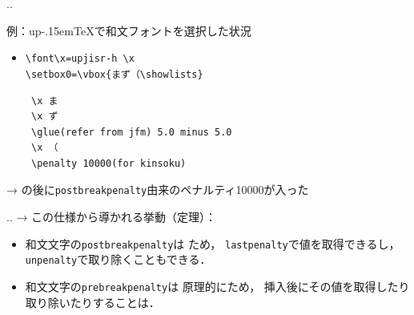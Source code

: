 \documentclass[a5paper,dvipdfmx,14pt]{beamer}
\def\cs#1{\texttt{\char92\nobreak#1}}
\def\pTeX{p\kern-.15em\TeX}
\def\upTeX{u\pTeX}
\begin{document}
\begin{frame}[t,fragile]{\insertsectionnumber.\insertsubsectionnumber. \insertsubsection}
{\footnotesize
例：\upTeX で和文フォントを選択した状況
\begin{itemize}
  \item \verb+\font\x=upjisr-h \x+\\
        \verb+\setbox0=\vbox{まず（\showlists}+
\begin{verbnote}
\begin{verbatim}
 \x ま
 \x ず
 \glue(refer from jfm) 5.0 minus 5.0
 \x （
 \penalty 10000(for kinsoku)
\end{verbatim}
\end{verbnote}
\end{itemize}\vskip-25pt
→ の後に\cs{postbreakpenalty}由来のペナルティ10000が入った
}
\end{frame}

\begin{frame}[t,fragile]{\insertsectionnumber.\insertsubsectionnumber. \insertsubsection}
{\small → この仕様から導かれる挙動（定理）：}\smallskip
\begin{tcolorbox}[colframe=black!70!blue,colback=white!90!blue]\small
\begin{itemize}\small\leftskip-18pt\baselineskip0pt
  \item 和文文字の\cs{postbreakpenalty}は
    ため，
    \cs{lastpenalty}で値を取得できるし，\cs{unpenalty}で取り除くこともできる．
  \item 和文文字の\cs{prebreakpenalty}は
    原理的にため，
    挿入後にその値を取得したり取り除いたりすることは．
\end{itemize}
\end{tcolorbox}
\end{frame}
\end{document}
